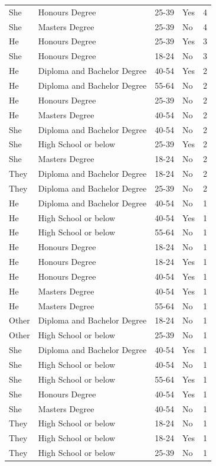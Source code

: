 \documentclass[]{interact}
\theoremstyle{plain}%
\theoremstyle{definition}
\theoremstyle{remark}
\begin{document}
\begin{table}
\begin{tabular}[t]{llllr}
She & Honours Degree & 25-39 & Yes & 4\\
She & Masters Degree & 25-39 & No & 4\\
He & Honours Degree & 25-39 & Yes & 3\\
She & Honours Degree & 18-24 & No & 3\\
He & Diploma and Bachelor Degree & 40-54 & Yes & 2\\
He & Diploma and Bachelor Degree & 55-64 & No & 2\\
He & Honours Degree & 25-39 & No & 2\\
He & Masters Degree & 40-54 & No & 2\\
She & Diploma and Bachelor Degree & 40-54 & No & 2\\
She & High School or below & 25-39 & Yes & 2\\
She & Masters Degree & 18-24 & No & 2\\
They & Diploma and Bachelor Degree & 18-24 & No & 2\\
They & Diploma and Bachelor Degree & 25-39 & No & 2\\
He & Diploma and Bachelor Degree & 40-54 & No & 1\\
He & High School or below & 40-54 & Yes & 1\\
He & High School or below & 55-64 & No & 1\\
He & Honours Degree & 18-24 & No & 1\\
He & Honours Degree & 18-24 & Yes & 1\\
He & Honours Degree & 40-54 & Yes & 1\\
He & Masters Degree & 40-54 & Yes & 1\\
He & Masters Degree & 55-64 & No & 1\\
Other & Diploma and Bachelor Degree & 18-24 & No & 1\\
Other & High School or below & 25-39 & No & 1\\
She & Diploma and Bachelor Degree & 40-54 & Yes & 1\\
She & High School or below & 40-54 & No & 1\\
She & High School or below & 55-64 & Yes & 1\\
She & Honours Degree & 40-54 & Yes & 1\\
She & Masters Degree & 40-54 & No & 1\\
They & High School or below & 18-24 & No & 1\\
They & High School or below & 18-24 & Yes & 1\\
They & High School or below & 25-39 & No & 1\\
\bottomrule
\end{tabular}
\end{table}
\end{document}
